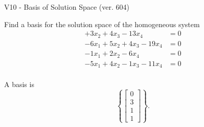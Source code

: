 \begin{exercise}
  \begin{exerciseTitle}V10 - Basis of Solution Space (ver. 604)\end{exerciseTitle}
  \begin{exerciseStatement}
    Find a basis for the solution space of the homogeneous system 
\begin{align*}
 + 3 x_ 2 + 4 x_ 3 -13 x_ 4 &= 0  \\ 
  -6 x_ 1 + 5 x_ 2 + 4 x_ 3 -19 x_ 4 &= 0  \\ 
  -1 x_ 1 + 2 x_ 2 -6 x_ 4 &= 0  \\ 
  -5 x_ 1 + 4 x_ 2 -1 x_ 3 -11 x_ 4 &= 0  \\ 
 \end{align*}


 
  \end{exerciseStatement}

  \begin{exerciseAnswer}
   A basis is   
\[\left\{\left[\begin{array}{c}
0 \\
3 \\
1 \\
1
\end{array}\right]\right\}.\]

  


  \end{exerciseAnswer}
\end{exercise}